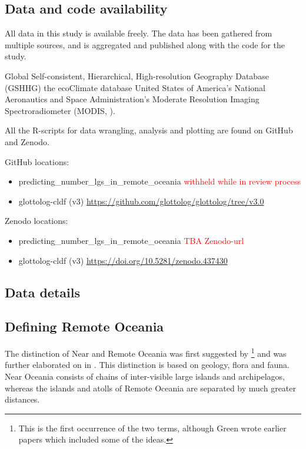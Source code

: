 \documentclass[unnumsec,webpdf,modern,medium]{oup-authoring-template}
\begin{document}
\begin{appendices}


\section{Data and code availability}
\label{supp_data_availability}

All data in this study is available freely. The data has been gathered from multiple sources, and is aggregated and published along with the code for the study.

Global Self-consistent, Hierarchical, High-resolution Geography Database (GSHHG) \citep{wessel1996global}
the ecoClimate database \citep{ecoclimate} 
United States of America's National Aeronautics and Space Administration's Moderate Resolution Imaging Spectroradiometer (MODIS, \citet{running2021modis_terra, running2021modis_aqua}).

All the R-scripts for data wrangling, analysis and plotting are found on GitHub and Zenodo.

GitHub locations:
\begin{itemize}
\item predicting\_number\_lgs\_in\_remote\_oceania  \textcolor{red}{withheld while in review process}
\item glottolog-cldf (v3) \url{https://github.com/glottolog/glottolog/tree/v3.0}
\end{itemize}

Zenodo locations:
\begin{itemize}
\item predicting\_number\_lgs\_in\_remote\_oceania  \textcolor{red}{TBA Zenodo-url}
\item glottolog-cldf (v3) \url{https://doi.org/10.5281/zenodo.437430}
\end{itemize}




\subsection{Data details}

\FloatBarrier
\subsection{Defining Remote Oceania}
The distinction of Near and Remote Oceania was first suggested by \citet{pawley1973dating}\footnote{This is the first occurrence of the two terms, although Green wrote earlier papers which included some of the ideas.} and was further elaborated on in \citet{green1991near}. This distinction is based on geology, flora and fauna. Near Oceania consists of chains of inter-visible large islands and archipelagos, whereas the islands and atolls of Remote Oceania are separated by much greater distances. 


\end{appendices}
\end{document}
